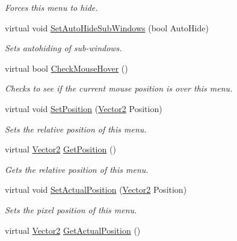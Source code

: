 \begin{DoxyCompactItemize}
\begin{DoxyCompactList}\small\item\em Forces this menu to hide. \item\end{DoxyCompactList}\item 
virtual void \hyperlink{classphys_1_1UI_1_1Menu_a5525e3823dcd23269cd410dfb2a1e232}{SetAutoHideSubWindows} (bool AutoHide)
\begin{DoxyCompactList}\small\item\em Sets autohiding of sub-\/windows. \item\end{DoxyCompactList}\item 
virtual bool \hyperlink{classphys_1_1UI_1_1Menu_af2514d2614322856f604be2e167d0872}{CheckMouseHover} ()
\begin{DoxyCompactList}\small\item\em Checks to see if the current mouse position is over this menu. \item\end{DoxyCompactList}\item 
virtual void \hyperlink{classphys_1_1UI_1_1Menu_a8c10ff94f6830198069b86ffca13180a}{SetPosition} (\hyperlink{classphys_1_1Vector2}{Vector2} Position)
\begin{DoxyCompactList}\small\item\em Sets the relative position of this menu. \item\end{DoxyCompactList}\item 
virtual \hyperlink{classphys_1_1Vector2}{Vector2} \hyperlink{classphys_1_1UI_1_1Menu_a3c19fe2596fe4049325cc580daa70387}{GetPosition} ()
\begin{DoxyCompactList}\small\item\em Gets the relative position of this menu. \item\end{DoxyCompactList}\item 
virtual void \hyperlink{classphys_1_1UI_1_1Menu_a47467f7de6b1a3621f23652c54041435}{SetActualPosition} (\hyperlink{classphys_1_1Vector2}{Vector2} Position)
\begin{DoxyCompactList}\small\item\em Sets the pixel position of this menu. \item\end{DoxyCompactList}\item 
virtual \hyperlink{classphys_1_1Vector2}{Vector2} \hyperlink{classphys_1_1UI_1_1Menu_a74a1b8e9b1c5d36c12e5a0a7f813c40a}{GetActualPosition} ()

\end{DoxyCompactItemize}
